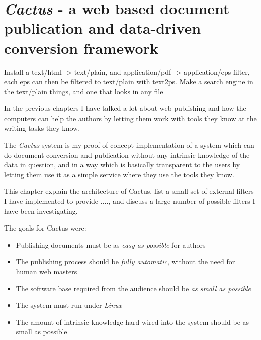 



\chapter{\textit{Cactus} - a web based document publication and data-driven
  conversion framework}



\textsf{Install a text/html -> text/plain, and application/pdf ->
  application/eps filter, each eps can then be filtered to text/plain
  with text2ps.  Make a search engine in the text/plain things, and
  one that looks in any file}



In the previous chapters I have talked a lot about web
publishing and how the computers can help the authors by
letting them work with tools they know at the writing tasks
they know.

The \textit{Cactus} system is my proof-of-concept
implementation of a system which can do document conversion
and publication without any intrinsic knowledge of the data
in question, and in a way which is basically transparent to
the users by letting them use it as a simple service where
they use the tools they know.

This chapter explain the architecture of Cactus,
 list a small
set of external filters I have implemented to provide
\textsf{....}, and
discuss a large number of possible filters I have been
investigating.

The goals for Cactus were:

\begin{itemize}
\item Publishing documents must be as \textit{easy as
    possible} for authors
  
\item The publishing process should be \textit{fully
    automatic}, without the need for human web masters
  
\item The software base required from the audience should be
  \textit{as small as possible}
  
\item The system must run under \textit{Linux}
  
\item The amount of intrinsic knowledge hard-wired into the
  system should be as small as possible

\end{itemize}

